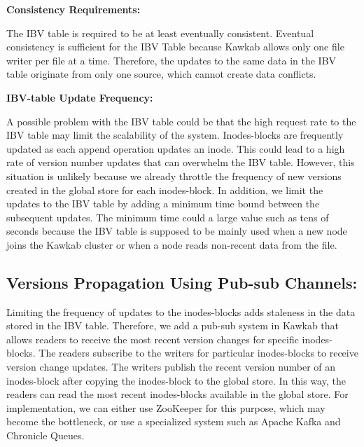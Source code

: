 \documentclass[]{article}
\newcommand{\subtopic}[1]{\vspace{1.5pt} \noindent \textbf{#1}}
\begin{document}
\subtopic{Consistency Requirements:}

The IBV table is required to be at least eventually consistent.  Eventual
consistency is sufficient for the IBV Table because Kawkab allows only one file
writer per file at a time.
Therefore, the updates to the same data in the IBV table originate from only
one source, which cannot create data conflicts.

\subtopic{IBV-table Update Frequency:}

A possible problem with the IBV table could be that the high request rate to
the IBV table may limit the scalability of the system. Inodes-blocks are
frequently updated as each append operation updates an inode. This could lead
to a high rate of version number updates that can overwhelm the IBV table.
However, this situation is unlikely because we already throttle the frequency
of new versions created in the global store for each inodes-block.  In
addition, we limit the updates to the IBV table by adding a minimum time bound
between the subsequent updates. The minimum time
could a large value such as tens of seconds because the IBV table is 
supposed to be mainly used when a new node joins the Kawkab cluster or when a node
reads non-recent data from the file.


\subsection{Versions Propagation Using Pub-sub Channels:}

Limiting the frequency of updates to the inodes-blocks adds staleness in the
data stored in the IBV table. Therefore, we add a pub-sub system in Kawkab that
allows readers to receive the most recent version changes for specific
inodes-blocks. The readers subscribe to the writers for particular
inodes-blocks to receive version change updates. The writers publish the recent
version number of an inodes-block after copying the inodes-block to the global
store. In this way, the readers can read the most recent inodes-blocks
available in the global store.
For implementation, we can either use ZooKeeper for this purpose, which may
become the bottleneck, or use a specialized system such as Apache Kafka and
Chronicle Queues.
\end{document}
